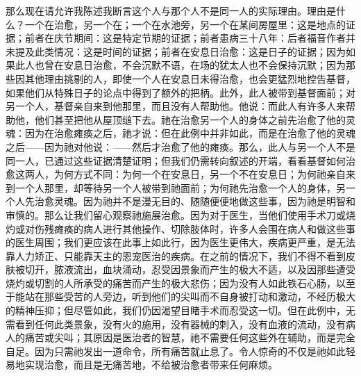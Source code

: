 那么现在请允许我陈述我断言这个人与那个人不是同一人的实际理由。理由是什么？一个在治愈，另一个在；一个在水池旁，另一个在某间房屋里：这是地点的证据；前者在庆节期间：这是特定节期的证据；前者患病三十八年：后者福音作者并未提及此类情况：这是时间的证据；前者在安息日治愈：这是日子的证据；因为如果此人也曾在安息日治愈，不会沉默不语，在场的犹太人也不会保持沉默；因为那些因其他理由挑剔的人，即使一个人在安息日未得治愈，也会更猛烈地控告基督，如果他们从特殊日子的论点中得到了额外的把柄。此外，此人被带到基督面前；对另一个人，基督亲自来到他那里，而且没有人帮助他。他说：而此人有许多人来帮助他，他们甚至把他从屋顶缒下去。祂在治愈另一个人的身体之前先治愈了他的灵魂：因为在治愈瘫痪之后，祂才说：但在此例中并非如此，而是在治愈了他的灵魂之后——因为祂对他说：——然后才治愈了他的瘫痪。那么，此人与另一个人不是同一人，已通过这些证据清楚证明；但我们仍需转向叙述的开端，看看基督如何治愈这两人，为何方式不同：为何一个在安息日，另一个不在安息日；为何祂亲自来到一个人那里，却等待另一个人被带到祂面前；为何祂先治愈一个人的身体，另一个人先治愈灵魂。因为祂并不是漫无目的、随随便便地做这些事，因为祂是明智和审慎的。那么让我们留心观察祂施展治愈。因为对于医生，当他们使用手术刀或烧灼或对伤残瘫痪的病人进行其他操作、切除肢体时，许多人会围在病人和做这些事的医生周围；我们更应该在此事上如此行，因为医生更伟大，疾病更严重，是无法靠人力矫正、只能靠天主的恩宠医治的疾病。在之前的情况下，我们不得不看到皮肤被切开，脓液流出，血块涌动，忍受因景象而产生的极大不适，以及因那些遭受烧灼或切割的人所承受的痛苦而产生的极大悲伤；因为没有人如此铁石心肠，以至于能站在那些受苦的人旁边，听到他们的尖叫而不自身被打动和激动，不经历极大的精神压抑；但尽管如此，我们仍因渴望目睹手术而忍受这一切。但在此例中，无需看到任何此类景象，没有火的施用，没有器械的刺入，没有血液的流动，没有病人的痛苦或尖叫；其原因是医治者的智慧，祂不需要任何这些外在辅助，而是完全自足。因为只需祂发出一道命令，所有痛苦就止息了。令人惊奇的不仅是祂如此轻易地实现治愈，而且是无痛苦地，不给被治愈者带来任何麻烦。\par

